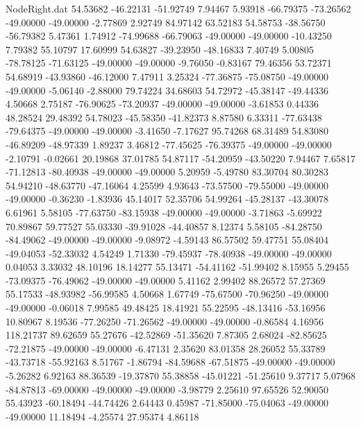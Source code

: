 \begin{filecontents}{NodeRight.dat}
  54.53682  -46.22131  -51.92749     7.94467    5.93918  -66.79375  -73.26562  -49.00000  -49.00000   -2.77869    2.92749   84.97142   63.52183
  54.58753  -38.56750  -56.79382     5.47361    1.74912  -74.99688  -66.79063  -49.00000  -49.00000  -10.43250    7.79382   55.10797   17.60999
  54.63827  -39.23950  -48.16833     7.40749    5.00805  -78.78125  -71.63125  -49.00000  -49.00000   -9.76050   -0.83167   79.46356   53.72371
  54.68919  -43.93860  -46.12000     7.47911    3.25324  -77.36875  -75.08750  -49.00000  -49.00000   -5.06140   -2.88000   79.74224   34.68603
  54.72972  -45.38147  -49.44336     4.50668    2.75187  -76.90625  -73.20937  -49.00000  -49.00000   -3.61853    0.44336   48.28524   29.48392
  54.78023  -45.58350  -41.82373     8.87580    6.33311  -77.63438  -79.64375  -49.00000  -49.00000   -3.41650   -7.17627   95.74268   68.31489
  54.83080  -46.89209  -48.97339     1.89237    3.46812  -77.45625  -76.39375  -49.00000  -49.00000   -2.10791   -0.02661   20.19868   37.01785
  54.87117  -54.20959  -43.50220     7.94467    7.65817  -71.12813  -80.40938  -49.00000  -49.00000    5.20959   -5.49780   83.30704   80.30283
  54.94210  -48.63770  -47.16064     4.25599    4.93643  -73.57500  -79.55000  -49.00000  -49.00000   -0.36230   -1.83936   45.14017   52.35706
  54.99264  -45.28137  -43.30078     6.61961    5.58105  -77.63750  -83.15938  -49.00000  -49.00000   -3.71863   -5.69922   70.89867   59.77527
  55.03330  -39.91028  -44.40857     8.12374    5.58105  -84.28750  -84.49062  -49.00000  -49.00000   -9.08972   -4.59143   86.57502   59.47751
  55.08404  -49.04053  -52.33032     4.54249    1.71330  -79.45937  -78.40938  -49.00000  -49.00000    0.04053    3.33032   48.10196   18.14277
  55.13471  -54.41162  -51.99402     8.15955    5.29455  -73.09375  -76.49062  -49.00000  -49.00000    5.41162    2.99402   88.26572   57.27369
  55.17533  -48.93982  -56.99585     4.50668    1.67749  -75.67500  -70.96250  -49.00000  -49.00000   -0.06018    7.99585   49.48425   18.41921
  55.22595  -48.13416  -53.16956    10.80967    8.19536  -77.26250  -71.26562  -49.00000  -49.00000   -0.86584    4.16956  118.21737   89.62659
  55.27676  -42.52869  -51.35620     7.87305    2.68024  -82.85625  -72.21875  -49.00000  -49.00000   -6.47131    2.35620   83.01358   28.26052
  55.33789  -43.73718  -55.92163     8.51767   -1.86794  -84.59688  -67.51875  -49.00000  -49.00000   -5.26282    6.92163   88.36539  -19.37870
  55.38858  -45.01221  -51.25610     9.37717    5.07968  -84.87813  -69.00000  -49.00000  -49.00000   -3.98779    2.25610   97.65526   52.90050
  55.43923  -60.18494  -44.74426     2.64443    0.45987  -71.85000  -75.04063  -49.00000  -49.00000   11.18494   -4.25574   27.95374    4.86118

\end{filecontents}
